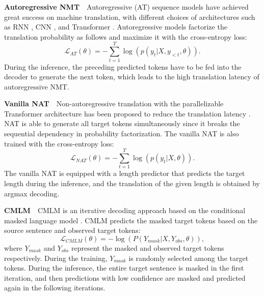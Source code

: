 \documentclass[letterpaper]{article} %
\begin{document}
\vspace{5pt}
\noindent{}\textbf{Autoregressive NMT}\ \ Autoregressive (AT) sequence models have achieved great success on machine translation, with different choices of architectures such as RNN \cite{bahdanau2014neural}, CNN \cite{gehring2017convolutional}, and Transformer \cite{vaswani2017attention}. Autoregressive models factorize the translation probability as follows and maximize it with the cross-entropy loss:
\begin{equation}
\mathcal{L}_{AT}(\theta) = -\sum_{t=1}^{T}\log(p(y_t|X,y_{<t},\theta)).
\end{equation}
During the inference, the preceding predicted tokens have to be fed into the decoder to generate the next token, which leads to the high translation latency of autoregressive NMT.

\vspace{5pt}
\noindent{}\textbf{Vanilla NAT}\ \ Non-autoregressive translation with the parallelizable Transformer architecture has been proposed to reduce the translation latency \cite{gu2017non}. NAT is able to generate all target tokens simultaneously since it breaks the sequential dependency in probability factorization. The vanilla NAT is also trained with the cross-entropy loss:
\begin{equation}
\label{eq:nat_mle}
\mathcal{L}_{NAT}(\theta) = -\sum_{t=1}^{T}\log(p(y_t|X,\theta)).
\end{equation}
The vanilla NAT is equipped with a length predictor that predicts the target length during the inference, and the translation of the given length is obtained by argmax decoding.

\vspace{5pt}
\noindent{}\textbf{CMLM}\ \ CMLM is an iterative decoding approach based on the conditional masked language model \cite{ghazvininejad2019maskpredict}. CMLM predicts the masked target tokens based on the source sentence and observed target tokens:
\begin{equation}
\mathcal{L}_{CMLM}(\theta) = -\log(P(Y_{mask}|X, Y_{obs},\theta)),
\end{equation}
where $Y_{mask}$ and $Y_{obs}$ represent the masked and observed target tokens respectively. During the training, $Y_{mask}$ is randomly selected among the target tokens. During the inference, the entire target sentence is masked in the first iteration, and then predictions with low confidence are masked and predicted again in the following iterations.
\end{document}
